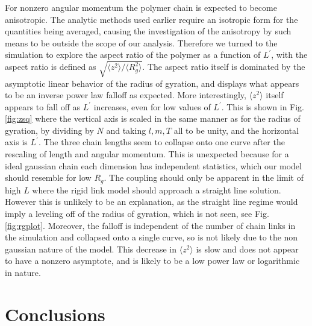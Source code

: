 \documentclass[pre,showpacs]{revtex4}
\begin{document}
For nonzero angular momentum the polymer chain is expected to become
anisotropic. The analytic methods used earlier require an isotropic
form for the quantities being averaged, causing the investigation
of the anisotropy by such means to be outside the scope of our
analysis. Therefore we turned to the simulation to explore the aspect
ratio of the polymer as a function of $L^\prime$, with the aspect ratio is defined
as $\sqrt{\langle z^2 \rangle /\langle R_g^2 \rangle}$. The aspect ratio
itself is dominated by the asymptotic linear behavior of the radius of
gyration, and displays what appears to be an inverse power law falloff
as expected. More interestingly, $\langle z^2 \rangle$ itself appears to
fall off as $L^\prime$ increases, even for low values of $L^\prime$.  This is shown in Fig. \ref{fig:zsq}  where the
vertical axis is scaled in the same manner as for the radius of gyration,
by dividing by $N$ and taking $l,m,T$ all to be unity, and the horizontal axis is $L^\prime$.  The three chain lengths seem to collapse onto one curve after the rescaling of length
and angular momentum. This is unexpected because for a ideal gaussian
chain each dimension has independent statistics, which our model should resemble for low $R_g$. The coupling should only be apparent in the limit of high $L$ where 
the rigid link model should approach a straight line solution. However
this is unlikely to be an explanation, as the straight line regime
would imply a leveling off of the radius of gyration, which is not
seen, see Fig. \ref{fig:rgplot}. Moreover, the falloff is independent of the number of chain links
in the simulation and collapsed onto a single curve, so is not likely
due to the non gaussian nature of the model. This decrease in $\langle z^2 \rangle$ is slow and
does not appear to have a nonzero asymptote, and is likely to be a low
power law or logarithmic in nature.




\section{Conclusions}
\end{document}
